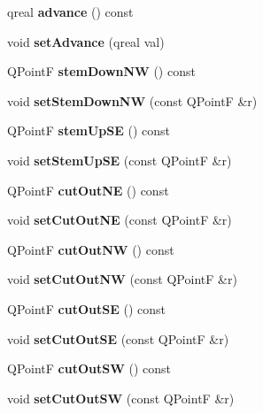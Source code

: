 \begin{DoxyCompactItemize}
\mbox{\label{class_ms_1_1_sym_a80bc4acacf81917660eb5e68d8a7a13a}} 
qreal {\bfseries advance} () const
\item 
\mbox{\label{class_ms_1_1_sym_adb4cf843e92adeffe7b7b18350351bc9}} 
void {\bfseries set\+Advance} (qreal val)
\item 
\mbox{\label{class_ms_1_1_sym_afa81270d1d2621f0cf49190a6ec1d676}} 
Q\+PointF {\bfseries stem\+Down\+NW} () const
\item 
\mbox{\label{class_ms_1_1_sym_a3438a0ce9a8c04118674200f7029cbed}} 
void {\bfseries set\+Stem\+Down\+NW} (const Q\+PointF \&r)
\item 
\mbox{\label{class_ms_1_1_sym_a77e8d2beb6c981ffc3cd3a507f83e163}} 
Q\+PointF {\bfseries stem\+Up\+SE} () const
\item 
\mbox{\label{class_ms_1_1_sym_ab68f1d6df29def96f577cc8828b192ee}} 
void {\bfseries set\+Stem\+Up\+SE} (const Q\+PointF \&r)
\item 
\mbox{\label{class_ms_1_1_sym_a53f30fb79f8b4635e32452efd0497d4f}} 
Q\+PointF {\bfseries cut\+Out\+NE} () const
\item 
\mbox{\label{class_ms_1_1_sym_a7c384cad2b007d816e2fbd3dec1e8865}} 
void {\bfseries set\+Cut\+Out\+NE} (const Q\+PointF \&r)
\item 
\mbox{\label{class_ms_1_1_sym_aa129f8c25d65d67e5671c042c19a5b48}} 
Q\+PointF {\bfseries cut\+Out\+NW} () const
\item 
\mbox{\label{class_ms_1_1_sym_a823d57d7a724f1ebdd41be61219b0747}} 
void {\bfseries set\+Cut\+Out\+NW} (const Q\+PointF \&r)
\item 
\mbox{\label{class_ms_1_1_sym_a2b68e4ca4dbc1af2e00964299b9ceffc}} 
Q\+PointF {\bfseries cut\+Out\+SE} () const
\item 
\mbox{\label{class_ms_1_1_sym_af9c8b5efab3c086b7c49434a7144ff9b}} 
void {\bfseries set\+Cut\+Out\+SE} (const Q\+PointF \&r)
\item 
\mbox{\label{class_ms_1_1_sym_a69fdecd13a57661e5bb5e407846b6f39}} 
Q\+PointF {\bfseries cut\+Out\+SW} () const
\item 
\mbox{\label{class_ms_1_1_sym_a53dddc4c689e638405a42fdb0b8f36ea}} 
void {\bfseries set\+Cut\+Out\+SW} (const Q\+PointF \&r)
\end{DoxyCompactItemize}
